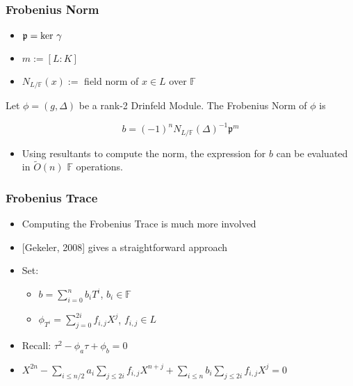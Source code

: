 \documentclass{beamer}
\newcommand{\f}{\mathbb{F}}
\newcommand{\ot}{\widetilde{O}}
\begin{document}
\begin{frame}
\frametitle{Frobenius Norm}

\begin{itemize}
     \item $\mathfrak{p} = \textnormal{ker } \gamma$
    \item $m:= [L : K]$
    \item $N_{L/\f}(x) := $ field norm of $x \in L$ over $\mathbb{F}$
\end{itemize}

\begin{theorem}["Gekeler", 1991]
Let $\phi = (g,\Delta)$ be a rank-2 Drinfeld Module. The Frobenius Norm of $\phi$ is

\[ b = (-1)^n N_{L/\f}(\Delta)^{-1}\mathfrak{p}^m \]
\end{theorem}

\begin{itemize}
    \item Using resultants to compute the norm, the expression for $b$ can be evaluated in $\ot(n)$ $\mathbb{F}$ operations.
\end{itemize}

\end{frame}

\begin{frame}
\frametitle{Frobenius Trace}

\begin{itemize}
    \item Computing the Frobenius Trace is much more involved
    \item $[$Gekeler, 2008] gives a straightforward approach
    \item Set:
    \begin{itemize}
        \item $b = \sum_{i=0}^n b_i T^i$, $b_i \in \mathbb{F}$
        \item $\phi_{T^i} = \sum_{j=0}^{2i}f_{i,j} X^j$, $f_{i,j} \in L$
    \end{itemize}
    \item Recall: $\tau^2 - \phi_a\tau + \phi_b = 0$
    \item $X^{2n} - \sum_{i \leq n/2}a_i\sum_{j\leq 2i}f_{i,j} X^{n + j} + \sum_{i\leq n}b_i \sum_{j \leq 2i}f_{i,j} X^j = 0 $
\end{itemize}


\end{frame}


\end{document}
